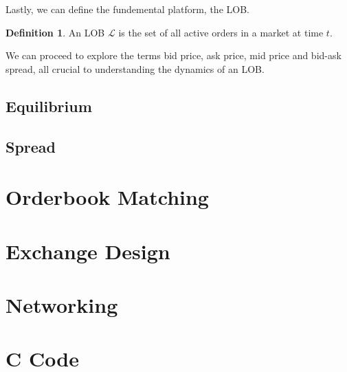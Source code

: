 \documentclass[12pt]{article}
\theoremstyle{definition}
\newtheorem{definition}{Definition}[section]
\begin{document}
Lastly, we can define the fundemental platform, the LOB.

\begin{definition}
  An LOB $\mathcal{L}$ is the set of all active orders in a market at time $t$.
\end{definition}

We can proceed to explore the terms bid price, ask price, mid price and bid-ask 
spread, all crucial to understanding the dynamics of an LOB. 

\subsection{Equilibrium}

\subsection{Spread}

\section{Orderbook Matching}

\section{Exchange Design}

\section{Networking}

\section{C Code}
\end{document}
